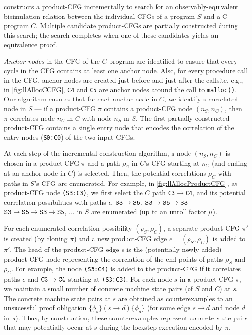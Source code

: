\toolName{} constructs a product-CFG incrementally to search for
an observably-equivalent bisimulation relation between
the individual CFGs of a \SpecL{} program $S$ and a C program $C$.
Multiple candidate product-CFGs are partially constructed
during this search; the search completes when one of these
candidates yields an equivalence proof.

{\em Anchor nodes} in the CFG of the $C$ program
are identified to ensure that every cycle in the CFG
contains at least one anchor node. Also, for
every procedure call in the CFG, anchor nodes
are created just before and just after the callsite, e.g.,
in \cref{fig:llAllocCCFG}, {\tt C4} and {\tt C5} are anchor
nodes around the call to {\tt malloc()}.
Our algorithm
ensures that for each anchor node in $C$, we
identify a correlated node in $S$ --- if
a product-CFG $\pi$
contains a product-CFG node $(n_S,n_C)$, then $\pi$
correlates node $n_C$
in $C$ with node $n_S$ in $S$.
The
first partially-constructed product-CFG
contains a single entry node
that encodes the correlation of the entry nodes ({\tt S0:C0})
of the two input CFGs.

At each step of the incremental construction algorithm,
a node $(n_S,n_C)$ is chosen in a product-CFG $\pi$
and a path $\rho_C$ in $C$'s CFG starting at $n_C$ (and
ending at an anchor node in $C$) is selected.
Then, the potential correlations $\rho_C$
with paths
in $S$'s CFG are enumerated.
For
example, in \cref{fig:llAllocProductCFG}, at product-CFG
node {\tt (S3:C3)}, we first select the $C$ path {\tt C3$\rightarrow$C4},
and its potential correlation possibilities
with paths $\epsilon$, ${\tt S3\rightarrow{}S5}$, ${\tt S3\rightarrow{}S5\rightarrow{}S3}$, ${\tt S3\rightarrow{}S5\rightarrow{}S3\rightarrow{}S5}$, ... in $S$ are enumerated (up to an unroll factor $\mu$).

For each enumerated correlation possibility $(\rho_S,\rho_C)$,
a separate
product-CFG $\pi'$ is created (by cloning $\pi$)
and a new product-CFG
edge $e=(\rho_S,\rho_C)$ is added to $\pi'$.
The head of the product-CFG edge $e$ is the
(potentially newly added) product-CFG node representing
the correlation of the end-points of paths $\rho_S$
and $\rho_C$. For example, the node {\tt (S3:C4)} is added
to the product-CFG if it correlates paths $\epsilon$ and ${\tt C3\rightarrow{}C4}$
starting at {\tt (S3:C3)}.
For each node $s$ in a product-CFG $\pi$, we maintain
a small number of
concrete machine state pairs (of $S$ and $C$) at $s$.
The concrete
machine state pairs at $s$
are obtained as
counterexamples to an unsucessful proof
obligation $\{\phi_s\} (s \rightarrow d) \{\phi_d\}$ (for
some edge $s \rightarrow d$ and node $d$ in $\pi$).
Thus, by construction, these counterexamples represent
concrete state pairs that
may potentially occur
at $s$ during the lockstep execution encoded
by $\pi$.

